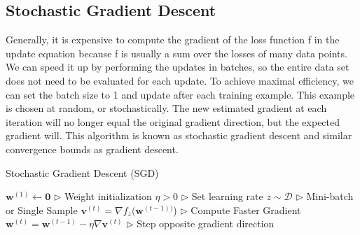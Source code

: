 \documentclass[11pt]{article}
\begin{document}
\subsection{Stochastic Gradient Descent}
Generally, it is expensive to compute the gradient of the loss function f in the update equation because f is usually a sum over the losses of many data points. We can speed it up by performing the updates in batches, so the entire data set does not need to be evaluated for each update. To achieve maximal efficiency, we can set the batch size to 1 and update after each training example. This example is chosen at random, or stochastically. The new estimated gradient at each iteration will no longer equal the original gradient direction, but the expected gradient will. This algorithm is known as stochastic gradient descent and similar convergence bounds as gradient descent.

\begin{algorithm}[H]
\caption{Stochastic Gradient Descent (SGD)}
\label{algo:sgd}
\begin{algorithmic}[1]
\STATE $\textbf{w}^{(1)} \leftarrow \textbf{0}$ \hfill $\triangleright$ Weight initialization
\STATE $\eta > 0$ \hfill $\triangleright$ Set learning rate
\STATE $z \sim \mathcal{D}$ \hfill $\triangleright$ Mini-batch or Single Sample
\STATE $\textbf{v}^{(t)} = \nabla f_z(\textbf{w}^{(t-1))}$) \hfill $\triangleright$ Compute Faster Gradient
\STATE $\textbf{w}^{(t)} = \textbf{w}^{(t-1)} - \eta \nabla \textbf{v}^{(t)}$ \hfill $\triangleright$
Step opposite gradient direction
\ENDFOR
\end{algorithmic}
\end{algorithm}
\end{document}
